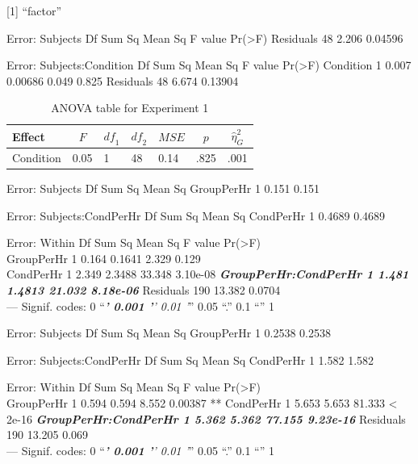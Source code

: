 \documentclass[man]{apa6}
\begin{document}
{[}1{]} \enquote{factor}

Error: Subjects Df Sum Sq Mean Sq F value Pr(\textgreater{}F) Residuals
48 2.206 0.04596

Error: Subjects:Condition Df Sum Sq Mean Sq F value Pr(\textgreater{}F)
Condition 1 0.007 0.00686 0.049 0.825 Residuals 48 6.674 0.13904

\begin{table}[tbp]
\begin{center}
\begin{threeparttable}
\caption{\label{tab:aovtable}ANOVA table for Experiment 1}
\begin{tabular}{lllllll}
\toprule
Effect & \multicolumn{1}{c}{$F$} & \multicolumn{1}{c}{$\mathit{df}_1$} & \multicolumn{1}{c}{$\mathit{df}_2$} & \multicolumn{1}{c}{$\mathit{MSE}$} & \multicolumn{1}{c}{$p$} & \multicolumn{1}{c}{$\hat{\eta}^2_G$}\\
\midrule
Condition & 0.05 & 1 & 48 & 0.14 & .825 & .001\\
\bottomrule
\end{tabular}
\end{threeparttable}
\end{center}
\end{table}

Error: Subjects Df Sum Sq Mean Sq GroupPerHr 1 0.151 0.151

Error: Subjects:CondPerHr Df Sum Sq Mean Sq CondPerHr 1 0.4689 0.4689

Error: Within Df Sum Sq Mean Sq F value Pr(\textgreater{}F)\\
GroupPerHr 1 0.164 0.1641 2.329 0.129\\
CondPerHr 1 2.349 2.3488 33.348 3.10e-08 \textbf{\emph{
GroupPerHr:CondPerHr 1 1.481 1.4813 21.032 8.18e-06 }} Residuals 190
13.382 0.0704\\
--- Signif. codes: 0 \enquote{\emph{\textbf{' 0.001 '}' 0.01 '}} 0.05
\enquote{.} 0.1 \enquote{} 1

Error: Subjects Df Sum Sq Mean Sq GroupPerHr 1 0.2538 0.2538

Error: Subjects:CondPerHr Df Sum Sq Mean Sq CondPerHr 1 1.582 1.582

Error: Within Df Sum Sq Mean Sq F value Pr(\textgreater{}F)\\
GroupPerHr 1 0.594 0.594 8.552 0.00387 ** CondPerHr 1 5.653 5.653 81.333
\textless{} 2e-16 \textbf{\emph{ GroupPerHr:CondPerHr 1 5.362 5.362
77.155 9.23e-16 }} Residuals 190 13.205 0.069\\
--- Signif. codes: 0 \enquote{\emph{\textbf{' 0.001 '}' 0.01 '}} 0.05
\enquote{.} 0.1 \enquote{} 1
\end{document}
